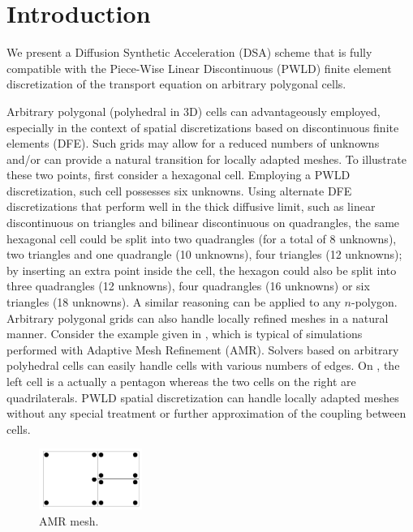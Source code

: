 \section{Introduction}

We present a Diffusion Synthetic Acceleration (DSA) scheme
that is fully compatible with the Piece-Wise Linear Discontinuous (PWLD) finite
element discretization of the transport equation on arbitrary
polygonal cells. 

Arbitrary polygonal (polyhedral in 3D) cells can advantageously employed, especially
in the context of spatial discretizations based on discontinuous finite elements (DFE).
Such grids may allow for a reduced numbers of unknowns and/or can provide a natural
transition for locally adapted meshes. To illustrate these two points, first consider
a hexagonal cell. Employing a PWLD discretization, such cell possesses six unknowns. Using
alternate DFE discretizations that perform well in the thick diffusive limit, such as 
linear discontinuous on triangles and bilinear discontinuous on quadrangles, the same 
hexagonal cell could be split into two quadrangles (for a total of 8 unknowns), two 
triangles and one quadrangle (10 unknowns), four triangles (12 unknowns); by inserting an 
extra point inside the cell, the hexagon could also be split into three quadrangles 
(12 unknowns), four quadrangles (16 unknowns) or six triangles (18 unknowns). A 
similar reasoning can be applied to any $n$-polygon. Arbitrary polygonal grids can 
also handle locally refined meshes in a natural manner. Consider the example given
in , which is typical of simulations performed with Adaptive Mesh 
Refinement (AMR). Solvers based on arbitrary polyhedral cells can easily handle cells 
with various numbers of edges. On , the left cell is a actually a
pentagon whereas the two cells on the right are quadrilaterals. PWLD spatial
discretization can handle locally adapted meshes without any special treatment 
or further approximation of the coupling between cells.
\begin{figure}[H]
   \centering
   \includegraphics[width=0.3\textwidth]{amr}
   \caption{AMR mesh.}
   \label{fig_amr}
\end{figure}


